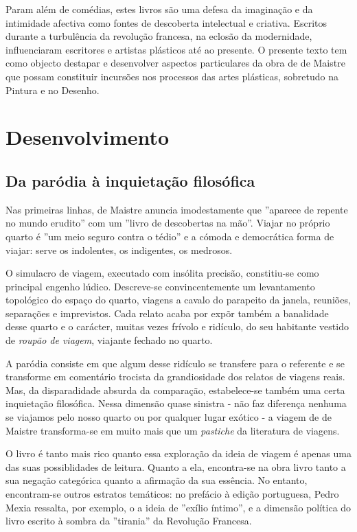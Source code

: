 \documentclass[12pt]{article}
\begin{document}
Param além de comédias, estes livros são uma defesa da imaginação e da
intimidade afectiva como fontes de descoberta intelectual e
criativa. Escritos durante a turbulência da revolução francesa, na
eclosão da modernidade, influenciaram escritores e artistas plásticos
até ao presente. O presente texto tem como objecto destapar e
desenvolver aspectos particulares da obra de de Maistre que possam
constituir incursões nos processos das artes plásticas, sobretudo na
Pintura e no Desenho.

\section{Desenvolvimento}

\subsection{Da paródia à inquietação filosófica}

Nas primeiras linhas, de Maistre anuncia imodestamente que ''aparece
de repente no mundo erudito'' com um ''livro de descobertas na
mão''. Viajar no próprio quarto é ''um meio seguro contra o tédio'' e
a cómoda e democrática forma de viajar: serve os indolentes, os
indigentes, os medrosos.

O simulacro de viagem, executado com insólita precisão, constitiu-se
como principal engenho lúdico. Descreve-se convincentemente um
levantamento topológico do espaço do quarto, viagens a cavalo do
parapeito da janela, reuniões, separações e imprevistos. Cada relato
acaba por expõr também a banalidade desse quarto e o carácter, muitas
vezes frívolo e ridículo, do seu habitante vestido de \emph{roupão de
  viagem}, viajante fechado no quarto.

A paródia consiste em que algum desse ridículo se transfere para o
referente e se transforme em comentário trocista da grandiosidade dos
relatos de viagens reais. Mas, da disparadidade absurda da comparação,
estabelece-se também uma certa inquietação filosófica. Nessa dimensão
quase sinistra - não faz diferença nenhuma se viajamos pelo nosso
quarto ou por qualquer lugar exótico - a viagem de de Maistre
transforma-se em muito mais que um \emph{pastiche} da literatura de
viagens.

O livro é tanto mais rico quanto essa exploração da ideia de viagem é
apenas uma das suas possiblidades de leitura. Quanto a ela,
encontra-se na obra livro tanto a sua negação categórica
\cite{queiroz} quanto a afirmação da sua essência. No entanto,
encontram-se outros estratos temáticos: no prefácio à edição
portuguesa, Pedro Mexia ressalta, por exemplo, o a ideia de ''exílio
íntimo'', e a dimensão política do livro escrito à sombra da
''tirania'' da Revolução Francesa.
\end{document}
